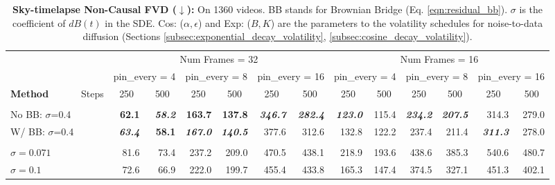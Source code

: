 \begin{table}[htbp]
\centering\tiny
\caption{\textbf{Sky-timelapse Non-Causal FVD ($\downarrow$):} On 1360 videos. BB stands for Brownian Bridge (Eq. \ref{eqn:residual_bb}). $\sigma$ is the coefficient of $dB(t)$ in the SDE. Cos: ($\alpha, \epsilon$) and Exp: ($B, K$) are the parameters to the volatility schedules for noise-to-data diffusion (Sections \ref{subsec:exponential_decay_volatility}, \ref{subsec:cosine_decay_volatility}).}
\label{tab:sky_NON_causal_fvd}
\begin{tabular}{lrrrrrrrrrrrr}
\toprule
 & \multicolumn{6}{c}{Num Frames = 32} & \multicolumn{6}{c}{Num Frames = 16} \\
\cmidrule(lr){2-7} \cmidrule(lr){8-13}
 & \multicolumn{2}{c}{pin\_every = 4} & \multicolumn{2}{c}{pin\_every = 8} & \multicolumn{2}{c}{pin\_every = 16} & \multicolumn{2}{c}{pin\_every = 4} & \multicolumn{2}{c}{pin\_every = 8} & \multicolumn{2}{c}{pin\_every = 16} \\
\cmidrule(lr){2-3} \cmidrule(lr){4-5} \cmidrule(lr){6-7} \cmidrule(lr){8-9} \cmidrule(lr){10-11} \cmidrule(lr){12-13}
\textbf{Method} \ \ \ \ \ \ Steps & \multicolumn{1}{c}{250} & \multicolumn{1}{c}{500} & \multicolumn{1}{c}{250} & \multicolumn{1}{c}{500} & \multicolumn{1}{c}{250} & \multicolumn{1}{c}{500} & \multicolumn{1}{c}{250} & \multicolumn{1}{c}{500} & \multicolumn{1}{c}{250} & \multicolumn{1}{c}{500} & \multicolumn{1}{c}{250} & \multicolumn{1}{c}{500} \\
\midrule
\rowcolor{gray!20} \multicolumn{13}{l}{\textit{ABC}} \\
\quad No BB: $\sigma$=0.4 & \textbf{62.1} & \textbf{\textit{58.2}} & \textbf{163.7} & \textbf{137.8} & \textbf{\textit{346.7}} & \textbf{\textit{282.4}} & \textbf{\textit{123.0}} & 115.4 & \textbf{\textit{234.2}} & \textbf{\textit{207.5}} & 314.3 & 279.0 \\
\quad W/ BB: $\sigma$=0.4 & \textbf{\textit{63.4}} & \textbf{58.1} & \textbf{\textit{167.0}} & \textbf{\textit{140.5}} & 377.6 & 312.6 & 132.8 & 122.2 & 237.4 & 211.4 & \textbf{\textit{311.3}} & 278.0 \\
\rowcolor{gray!20} \multicolumn{13}{l}{\textit{Conditional Diffusion Bridge ($\approx$ DDBM \cite{zhou2023denoising}, PFI \cite{chen2024probabilistic})}} \\
\quad $\sigma=0.071$ & 81.6 & 73.4 & 237.2 & 209.0 & 470.5 & 438.1 & 218.9 & 193.6 & 438.6 & 385.3 & 540.6 & 480.7 \\
\quad $\sigma=0.1$ & 72.6 & 66.9 & 222.0 & 199.7 & 455.4 & 433.8 & 165.3 & 147.4 & 374.5 & 327.1 & 451.3 & 402.1 \\

\end{tabular}
\end{table}
